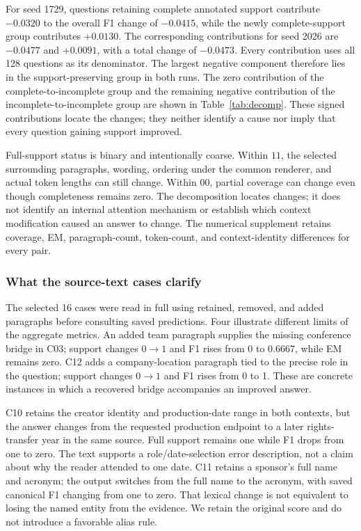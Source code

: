 \documentclass[preprint,12pt]{elsarticle}
\begin{document}

For seed 1729, questions retaining complete annotated support contribute $-0.0320$ to the overall F1 change of $-0.0415$, while the newly complete-support group contributes $+0.0130$. The corresponding contributions for seed 2026 are $-0.0477$ and $+0.0091$, with a total change of $-0.0473$. Every contribution uses all 128 questions as its denominator. The largest negative component therefore lies in the support-preserving group in both runs. The zero contribution of the complete-to-incomplete group and the remaining negative contribution of the incomplete-to-incomplete group are shown in Table~\ref{tab:decomp}. These signed contributions locate the changes; they neither identify a cause nor imply that every question gaining support improved.

Full-support status is binary and intentionally coarse. Within $11$, the selected surrounding paragraphs, wording, ordering under the common renderer, and actual token lengths can still change. Within $00$, partial coverage can change even though completeness remains zero. The decomposition locates changes; it does not identify an internal attention mechanism or establish which context modification caused an answer to change. The numerical supplement retains coverage, EM, paragraph-count, token-count, and context-identity differences for every pair.

\subsubsection{What the source-text cases clarify}
The selected 16 cases were read in full using retained, removed, and added paragraphs before consulting saved predictions. Four illustrate different limits of the aggregate metrics. An added team paragraph supplies the missing conference bridge in C03; support changes $0\to1$ and F1 rises from 0 to 0.6667, while EM remains zero. C12 adds a company-location paragraph tied to the precise role in the question; support changes $0\to1$ and F1 rises from 0 to 1. These are concrete instances in which a recovered bridge accompanies an improved answer.

C10 retains the creator identity and production-date range in both contexts, but the answer changes from the requested production endpoint to a later rights-transfer year in the same source. Full support remains one while F1 drops from one to zero. The text supports a role/date-selection error description, not a claim about why the reader attended to one date. C11 retains a sponsor's full name and acronym; the output switches from the full name to the acronym, with saved canonical F1 changing from one to zero. That lexical change is not equivalent to losing the named entity from the evidence. We retain the original score and do not introduce a favorable alias rule.
\end{document}
